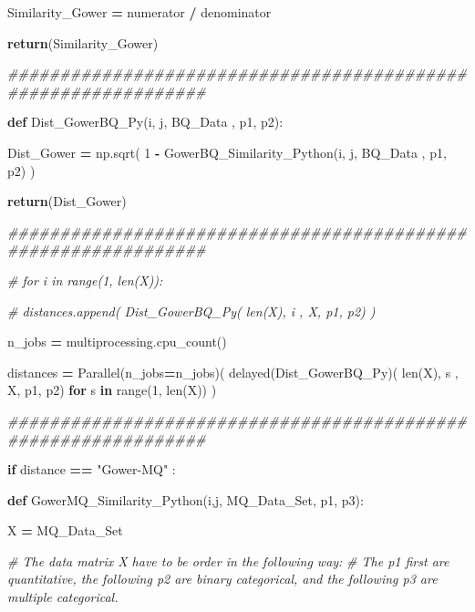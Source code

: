 \documentclass[
  11pt,
  a4paper,
]{article}
\newenvironment{Shaded}{\begin{snugshade}}{\end{snugshade}}
\newcommand{\BuiltInTok}[1]{#1}
\newcommand{\CommentTok}[1]{\textcolor[rgb]{0.56,0.35,0.01}{\textit{#1}}}
\newcommand{\ControlFlowTok}[1]{\textcolor[rgb]{0.13,0.29,0.53}{\textbf{#1}}}
\newcommand{\DecValTok}[1]{\textcolor[rgb]{0.00,0.00,0.81}{#1}}
\newcommand{\KeywordTok}[1]{\textcolor[rgb]{0.13,0.29,0.53}{\textbf{#1}}}
\newcommand{\NormalTok}[1]{#1}
\newcommand{\OperatorTok}[1]{\textcolor[rgb]{0.81,0.36,0.00}{\textbf{#1}}}
\newcommand{\StringTok}[1]{\textcolor[rgb]{0.31,0.60,0.02}{#1}}
\begin{document}
\begin{Shaded}
\begin{Highlighting}[]
\NormalTok{            Similarity\_Gower }\OperatorTok{=}\NormalTok{ numerator }\OperatorTok{/}\NormalTok{ denominator  }

            \ControlFlowTok{return}\NormalTok{(Similarity\_Gower)}

\CommentTok{\#\#\#\#\#\#\#\#\#\#\#\#\#\#\#\#\#\#\#\#\#\#\#\#\#\#\#\#\#\#\#\#\#\#\#\#\#\#\#\#\#\#\#\#\#\#\#\#\#\#\#\#\#\#\#\#\#\#\#\#\#\#\#}

        \KeywordTok{def}\NormalTok{ Dist\_GowerBQ\_Py(i, j, BQ\_Data ,  p1, p2):}

\NormalTok{            Dist\_Gower }\OperatorTok{=}\NormalTok{ np.sqrt( }\DecValTok{1} \OperatorTok{{-}}\NormalTok{ GowerBQ\_Similarity\_Python(i, j, BQ\_Data , p1, p2) )}

            \ControlFlowTok{return}\NormalTok{(Dist\_Gower)}

\CommentTok{\#\#\#\#\#\#\#\#\#\#\#\#\#\#\#\#\#\#\#\#\#\#\#\#\#\#\#\#\#\#\#\#\#\#\#\#\#\#\#\#\#\#\#\#\#\#\#\#\#\#\#\#\#\#\#\#\#\#\#\#\#\#\#}

        \CommentTok{\# for i in range(1, len(X)):}

        \CommentTok{\# distances.append( Dist\_GowerBQ\_Py( len(X), i , X, p1, p2) )}

\NormalTok{        n\_jobs  }\OperatorTok{=}\NormalTok{ multiprocessing.cpu\_count()}

\NormalTok{        distances }\OperatorTok{=}\NormalTok{ Parallel(n\_jobs}\OperatorTok{=}\NormalTok{n\_jobs)( delayed(Dist\_GowerBQ\_Py)( }\BuiltInTok{len}\NormalTok{(X), s , X, p1, p2) }\ControlFlowTok{for}\NormalTok{ s }\KeywordTok{in} \BuiltInTok{range}\NormalTok{(}\DecValTok{1}\NormalTok{, }\BuiltInTok{len}\NormalTok{(X)) )}


\CommentTok{\#\#\#\#\#\#\#\#\#\#\#\#\#\#\#\#\#\#\#\#\#\#\#\#\#\#\#\#\#\#\#\#\#\#\#\#\#\#\#\#\#\#\#\#\#\#\#\#\#\#\#\#\#\#\#\#\#\#\#\#\#\#\#}
    
    \ControlFlowTok{if}\NormalTok{ distance }\OperatorTok{==} \StringTok{"Gower{-}MQ"}\NormalTok{ :}
        
        \KeywordTok{def}\NormalTok{ GowerMQ\_Similarity\_Python(i,j, MQ\_Data\_Set, p1, p3):}

\NormalTok{            X }\OperatorTok{=}\NormalTok{ MQ\_Data\_Set}

   \CommentTok{\# The data matrix X have to be order in the following way:}
   \CommentTok{\# The p1 first are quantitative, the following p2 are binary categorical, and the following p3 are multiple categorical.}


\end{Highlighting}
\end{Shaded}
\end{document}
